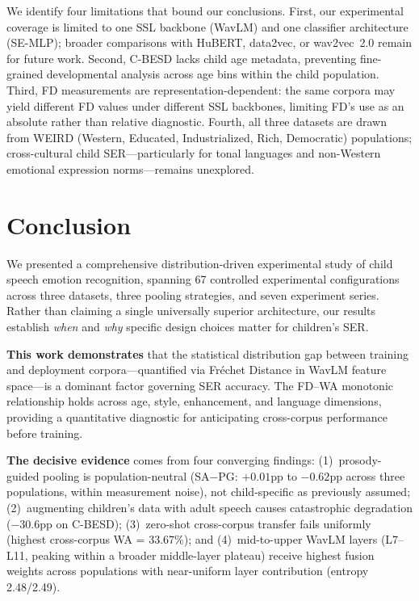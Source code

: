 \documentclass[11pt,a4paper]{article}
\begin{document}
We identify four limitations that bound our conclusions. First, our
experimental coverage is limited to one SSL backbone (WavLM) and one classifier
architecture (SE-MLP); broader comparisons with HuBERT, data2vec, or wav2vec~2.0
remain for future work. Second, C-BESD lacks child age metadata, preventing
fine-grained developmental analysis across age bins within the child population.
Third, FD measurements are representation-dependent: the same corpora may yield
different FD values under different SSL backbones, limiting FD's use as an
absolute rather than relative diagnostic. Fourth, all three datasets are drawn
from WEIRD (Western, Educated, Industrialized, Rich, Democratic) populations;
cross-cultural child SER---particularly for tonal languages and non-Western
emotional expression norms---remains unexplored.


\section{Conclusion}
\label{sec:conclusion}

We presented a comprehensive distribution-driven experimental study of child
speech emotion recognition, spanning 67 controlled experimental configurations
across three datasets, three pooling strategies, and seven experiment series.
Rather than claiming a single universally superior architecture, our results
establish \textit{when} and \textit{why} specific design choices matter for
children's SER.

\textbf{This work demonstrates} that the statistical distribution gap between
training and deployment corpora---quantified via Fr\'{e}chet Distance in WavLM
feature space---is a dominant factor governing SER accuracy. The FD--WA
monotonic relationship holds across age, style, enhancement, and language
dimensions, providing a quantitative diagnostic for anticipating cross-corpus
performance before training.

\textbf{The decisive evidence} comes from four converging findings:
(1)~prosody-guided pooling is population-neutral (SA$-$PG: $+0.01$pp to
$-0.62$pp across three populations, within measurement noise), not
child-specific as previously assumed; (2)~augmenting children's data with adult
speech causes catastrophic degradation ($-30.6$pp on C-BESD); (3)~zero-shot
cross-corpus transfer fails uniformly (highest cross-corpus WA = 33.67\%); and
(4)~mid-to-upper WavLM layers (L7--L11, peaking within a broader
middle-layer plateau) receive highest fusion weights across
populations with near-uniform layer contribution (entropy 2.48/2.49).
\end{document}
